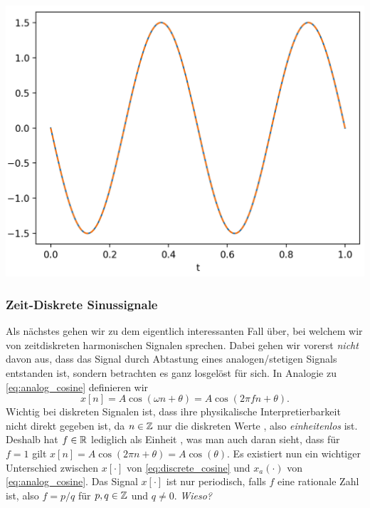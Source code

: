 \begin{listing}
    \begin{minipage}{0.49\textwidth}
        \inputminted[firstline=4]{python3}{code/cont_harms.py}
    \end{minipage}%
    \begin{minipage}{0.49\textwidth}
        \strut\vspace*{-\baselineskip}\newline
        \includegraphics[width=\textwidth]{code/cont_harms.png}
    \end{minipage}
    \label{py:cont_harms}
\end{listing}
\FloatBarrier
%
\subsubsection{Zeit-Diskrete Sinussignale}
%
Als nächstes gehen wir zu dem eigentlich interessanten Fall über, bei welchem wir von zeitdiskreten harmonischen Signalen sprechen.
Dabei gehen wir vorerst \emph{nicht} davon aus, dass das Signal durch Abtastung eines analogen/stetigen Signals entstanden ist, sondern betrachten es ganz losgelöst für sich.
In Analogie zu \eqref{eq:analog_cosine} definieren wir
%
\begin{equation}\label{eq:discrete_cosine}
    x[n] = A \cos(\omega n + \theta) = A \cos(2 \pi f n + \theta).
\end{equation}
%
Wichtig bei diskreten Signalen ist, dass ihre physikalische Interpretierbarkeit nicht direkt gegeben ist, da $n \in \mathbb{Z}$ nur die diskreten Werte , also \emph{einheitenlos} ist.
Deshalb hat $f \in \mathbb{R}$ lediglich als Einheit , was man auch daran sieht, dass für $f = 1$ gilt $x[n] = A \cos(2\pi n + \theta) = A \cos(\theta)$.
Es existiert nun ein wichtiger Unterschied zwischen $x[\cdot]$ von \eqref{eq:discrete_cosine} und $x_a(\cdot)$ von \eqref{eq:analog_cosine}.
Das Signal $x[\cdot]$ ist nur periodisch, falls $f$ eine rationale Zahl ist, also $f = p/q$ für $p,q \in \mathbb{Z}$ und $q \neq 0$. 
\emph{Wieso?}


